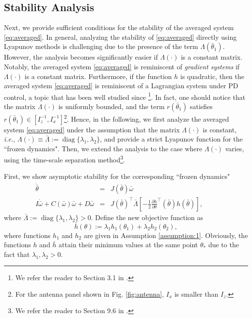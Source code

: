 \documentclass{ifacconf}
\begin{document}
\subsection{Stability Analysis}

Next, we provide sufficient conditions for the stability of the averaged system \eqref{eq:averaged}. In general, analyzing the stability of \eqref{eq:averaged} directly using Lyapunov methods is challenging due to the presence of the term $\Lambda(\bar{\theta}_1)$. However, the analysis becomes significantly easier if $\Lambda(\cdot)$ is a constant matrix. Notably, the averaged system \eqref{eq:averaged} is reminiscent of \textit{gradient systems} if $\Lambda(\cdot)$ is a constant matrix. Furthermore, if the function $h$ is quadratic, then the averaged system \eqref{eq:averaged} is reminiscent of a Lagrangian system under PD control, a topic that has been well studied since \cite{takegaki1981new}\footnote{We refer the reader to Section 3.1 in \cite{ortega1998euler}.}. In fact, one should notice that the matrix $\Lambda(\cdot)$ is uniformly bounded, and the term $r(\bar{\theta}_1)$ satisfies $r(\bar{\theta}_1)\in[I_z^{-1}, I_x^{-1}]$\footnote{For the antenna panel shown in Fig. \ref{fig:antenna}, $I_x$ is smaller than $I_z$.}. Hence, in the following, we first analyze the averaged system \eqref{eq:averaged} under the assumption that the matrix \( \Lambda(\cdot) \) is constant, \textit{i.e.}, \( \Lambda(\cdot) \equiv \bar{\Lambda}:= \operatorname{diag}\{\lambda_1, \lambda_2\} \), and provide a strict Lyapunov function for the ``frozen dynamics". Then, we extend the analysis to the case where \( \Lambda(\cdot) \) varies, using the time-scale separation method\footnote{We refer the reader to Section 9.6 in \cite{Khalil:1173048}.}.

First, we show asymptotic stability for the corresponding ``frozen dynamics"
\begin{subequations}
  \label{eq:frozen}
  \begin{eqnarray}
       \dot{\bar{\theta}} &=&J(\bar{\theta})\bar{\omega}  \label{eq:frozen-a}\\
       I\dot{\bar{\omega}}+C(\bar{\omega})\bar{\omega} + D\bar{\omega}&=& J(\bar{\theta})^\top \bar{\Lambda}\left[-\frac{1}{2}\frac{\partial h}{\partial \theta}^\top(\bar{\theta}) h(\bar{\theta})\right], \quad\quad\label{eq:frozen-b}
  \end{eqnarray}
\end{subequations}
where $\bar{\Lambda} := \operatorname{diag}\{\lambda_1, \lambda_2\}>0$. Define the new objective function as
\begin{equation}
    \bar{h}(\theta):=\lambda_1h_1(\theta_1)+\lambda_2h_2(\theta_2),
\end{equation}
where functions $h_1$ and $h_2$ are given in Assumption \ref{assumption:1}. Obviously, the functions 
$h$ and $\bar{h}$ attain their minimum values at the same point $\theta_*$ due to the fact that $\lambda_1,\lambda_2>0$.
\end{document}
